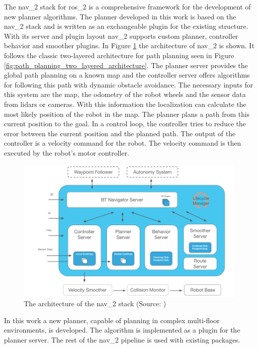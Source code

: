 The \gls{nav_2} stack for \gls{ros_2} is a comprehensive framework for the development of new planner algorithms. The planner developed in this work is based on the \gls{nav_2} stack and is written as an exchangeable plugin for the existing structure. With its server and plugin layout \gls{nav_2} supports custom planner, controller behavior and smoother plugins. In Figure \ref{fig:nav2_architecture} the architecture of \gls{nav_2} is shown. It follows the classic two-layered architecture for path planning seen in Figure \ref{fig:path_planning_two_layered_architecture}. The planner server provides the global path planning on a known map and the controller server offers algorithms for following this path with dynamic obstacle avoidance. The necessary inputs for this system are the map, the odometry of the robot wheels and the sensor data from lidars or cameras. With this information the localization can calculate the most likely position of the robot in the map. The planner plans a path from this current position to the goal. In a control loop, the controller tries to reduce the error between the current position and the planned path. The output of the controller is a velocity command for the robot. The velocity command is then executed by the robot's motor controller.

\begin{figure}[h]
    \centering
    \includegraphics[width=\textwidth]{figures/02_state_of_the_art/nav2_architecture.png}
    \caption[The architecture of the \gls{nav_2} stack]{The architecture of the \gls{nav_2} stack (Source: \cite{steve_macenski_navigation_2020})}
    \label{fig:nav2_architecture}
\end{figure}

In this work a new planner, capable of planning in complex multi-floor environments, is developed. The algorithm is implemented as a plugin for the planner server. The rest of the \gls{nav_2} pipeline is used with existing packages.

